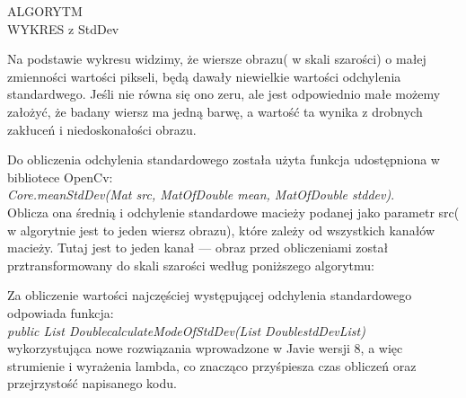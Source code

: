 \documentclass[a4paper,12pt]{article}
\begin{document}
			ALGORYTM\\
			WYKRES z StdDev
			
			Na podstawie wykresu widzimy, że wiersze obrazu( w skali szarości) o ma\l ej zmienności wartości pikseli, będą dawa\l y niewielkie wartości odchylenia standardwego. Jeśli nie równa się ono zeru, ale jest odpowiednio ma\l e możemy za\l ożyć, że badany wiersz ma jedną barwę, a wartość ta wynika z drobnych zak\l uceń i niedoskona\l ości obrazu.
			
			Do obliczenia odchylenia standardowego została użyta funkcja udostępniona w bibliotece OpenCv:\\ 
			\textit {Core.meanStdDev(Mat src, MatOfDouble mean, MatOfDouble stddev)}.\\
			Oblicza ona średnią i odchylenie standardowe macieży podanej jako parametr src( w algorytnie jest to jeden wiersz obrazu), które zależy od wszystkich kanałów macieży. Tutaj jest to jeden kanał --- obraz przed obliczeniami został prztransformowany do skali szarości według poniższego algorytmu:
			 
						
			Za obliczenie wartości najczęściej występującej odchylenia standardowego odpowiada funkcja: \\
			\textit {public List \guilsinglleft Double\guilsinglright calculateModeOfStdDev(List \guilsinglleft Double\guilsinglright stdDevList)}\\
			wykorzystująca nowe rozwiązania wprowadzone w Javie wersji 8, a więc strumienie i wyrażenia lambda, co znacząco przyśpiesza czas obliczeń oraz przejrzystość napisanego kodu. 
			
			
		
\end{document}
